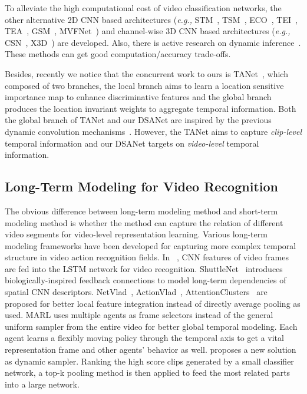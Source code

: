 \documentclass[sigconf]{acmart}
\begin{document}
To alleviate the high computational cost of video classification networks, the other alternative 2D CNN based architectures (\emph{e.g.,} STM~\cite{stm}, TSM~\cite{tsm}, ECO~\cite{eco}, TEI~\cite{teinet}, TEA~\cite{li2020tea}, GSM~\cite{GSM}, MVFNet~\cite{wu2020MVFNet}) and channel-wise 3D CNN based architectures (\emph{e.g.,} CSN~\cite{CSN}, X3D~\cite{feichtenhofer2020x3d}) are developed. 
Also, there is active research on dynamic inference~\cite{wu2020dynamic,wang2021adaptive}. These methods can get good computation/accuracy trade-offs. 

Besides, recently we notice that the concurrent work to ours is TANet~\cite{liu2020tam}, which composed of two branches, the local branch aims to learn a location sensitive importance map to enhance discriminative features and the global branch produces the location invariant weights to aggregate temporal information. Both the global branch of TANet and our DSANet are inspired by the previous dynamic convolution mechanisms~\cite{chen2020dynamic,wang2019carafe}. However, the TANet aims to capture \emph{clip-level} temporal information and our DSANet targets on \emph{video-level} temporal information. 



\subsection{Long-Term Modeling for Video Recognition}
The obvious difference between long-term modeling method and short-term modeling method is whether the method can capture the relation of different video segments for video-level representation learning.
Various long-term modeling frameworks have been developed for capturing more complex temporal structure in video action recognition fields.
In ~\cite{LRCN}, CNN features of video frames are fed into the LSTM network for video recognition.
ShuttleNet~\cite{shuttleNet} introduces biologically-inspired feedback connections to model long-term dependencies of spatial CNN descriptors. 
NetVlad~\cite{netvlad}, ActionVlad~\cite{actionvlad}, AttentionClusters~\cite{attentioncluster} are proposed for better local feature integration instead of directly average pooling as used. 
MARL\cite{wu2019multi} uses multiple agents as frame selectors instead of the general uniform sampler from the entire video for better global temporal modeling. 
Each agent learns a flexibly moving policy through the temporal axis to get a vital representation frame and other agents' behavior as well.
\cite{korbar2019scsampler} proposes a new solution as dynamic sampler. Ranking the high score clips generated by a small classifier network, a top-k pooling method is then applied to feed the most related parts into a large network. 
\end{document}
